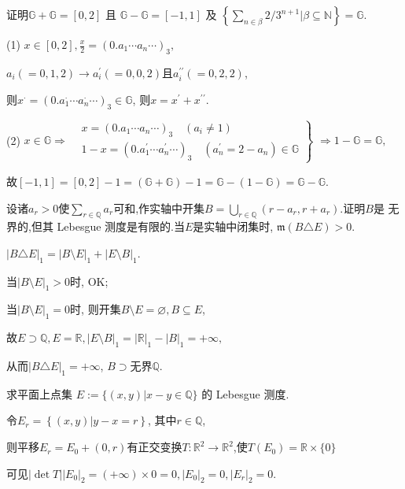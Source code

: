 \begin{3}
证明$\mathbb{G}+\mathbb{G}=[0,2]\text{ 且 }\mathbb{G}-\mathbb{G}=[-1,1]\text{ 及 }\left\{\sum\limits_{n\in\beta}2/3^{n+1}\Big|\beta\subseteq\mathbb{N}\right\}=\mathbb{G}.$
\end{3}
\begin{solution}

(1) $x\in[0,2],\frac{x}{2}=(0.a_1\cdots a_n\cdots)_3,$

$a_i(=0,1,2)\rightarrow a_i^{\prime}(=0,0,2)$且$a_i^{\prime\prime}(=0,2,2)$,

则$x^\cdot=(0.a_1^\cdot\cdots a_n^\cdot\cdots)_3\in\mathbb{G}$,
则$x=x^\prime+x^{\prime\prime}$.

(2) $x\in\mathbb{G}\Rightarrow\left.
\begin{aligned}
    &x=(0.a_1\cdots a_n\cdots)_3\quad(a_i\neq1)\\
    &1-x=(0.a_1^\prime\cdots a_n^\prime\cdots)_3\quad(a_n^\prime=2-a_n)\in\mathbb{G}
\end{aligned}\right\}$
$\Rightarrow 1-\mathbb{G}=\mathbb{G},$

故$[-1,1]=[0,2]-1=(\mathbb{G}+\mathbb{G})-1=\mathbb{G}-(1-\mathbb{G})=\mathbb{G}-\mathbb{G}.$

\end{solution}


\begin{4}
设诸$a_r>0$使$\sum\limits_{r\in\mathbb{Q}}a_r$可和,作实轴中开集$B=\bigcup\limits_{r\in\mathbb{Q}}(r-a_r,r+a_r)$.证明$B$是
无界的,但其 Lebesgue 测度是有限的.当$E$是实轴中闭集时, $\mathfrak{m}(B\triangle E)>0.$
\end{4}
\begin{solution}
$|B\triangle E|_{1}=|B\setminus E|_{1}+|E\setminus B|_{1}.$

当$|B\setminus E|_{1}>0$时, OK;

当$|B\setminus E|_{1}=0$时, 则开集$B\setminus E=\varnothing,B\subseteq E$,

故$E\supset\mathbb{Q},E=\mathbb{R},|E\setminus B|_{1}=|\mathbb{R}|_{1}-|B|_{1}=+\infty,$

从而$|B\triangle E|_{1}=+\infty$, $B\supset $无界$\mathbb{Q}.$
\end{solution}


\begin{7}
求平面上点集 $E:=\{(x,y)|x-y\in\mathbb{Q}\}$ 的 Lebesgue 测度.
\end{7}   
\begin{solution}
令$E_{r}=\left\{\left(x,y\right)|y-x=r\right\}$, 其中$r\in\mathbb{Q}$,

则平移$E_{r}=E_{0}+\left(0,r\right)$有正交变换$T:\mathbb{R}^{2}\to \mathbb{R}^{2}$,使$T(E_{0})=\mathbb{R}\times\{0\}$

可见$\left|\det T\right|\left|E_{0}\right|_{2}=(+\infty)\times0=0,\left|E_{0}\right|_{2}=0,\left|E_{r}\right|_{2}=0.$
\end{solution}


